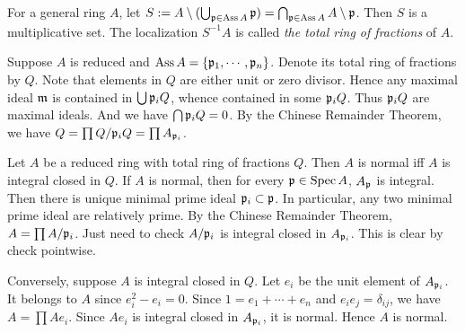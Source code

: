     \begin{remark}\label{rmk: total ring of fractions and normality of general reduced ring}
        For a general ring $A$, let $S := A\setminus (\bigcup_{{\mathfrak{p}} \in \operatorname{Ass} A} {\mathfrak{p}}) = \bigcap_{{\mathfrak{p}} \in \operatorname{Ass} A}A\setminus {\mathfrak{p}}$.
        Then $S$ is a multiplicative set.
        The localization $S^{-1}A$ is called \textit{the total ring of fractions} of $A$.
        
        Suppose $A$ is reduced and $\operatorname{Ass} A = \{{\mathfrak{p}}_1,\cdots,{\mathfrak{p}}_n\}$.
        Denote its total ring of fractions by $Q$.
        Note that elements in $Q$ are either unit or zero divisor.
        Hence any maximal ideal ${\mathfrak{m}}$ is contained in $\bigcup {\mathfrak{p}}_iQ$, whence contained in some ${\mathfrak{p}}_i Q$.
        Thus ${\mathfrak{p}}_i Q$ are maximal ideals.
        And we have $\bigcap {\mathfrak{p}}_i Q = 0$. 
        By the Chinese Remainder Theorem, we have $Q = \prod Q/{{\mathfrak{p}}_i}Q = \prod A_{{\mathfrak{p}}_i}$.
        
        Let $A$ be a reduced ring with total ring of fractions $Q$.
        Then $A$ is normal iff $A$ is integral closed in $Q$.
        If $A$ is normal, then for every ${\mathfrak{p}} \in \operatorname{Spec} A$, $A_{\mathfrak{p}}$ is integral.
        Then there is unique minimal prime ideal ${\mathfrak{p}}_i \subset {\mathfrak{p}}$.
        In particular, any two minimal prime ideal are relatively prime.
        By the Chinese Remainder Theorem, $A = \prod A/{\mathfrak{p}}_i$.
        Just need to check $A/{\mathfrak{p}}_i$ is integral closed in $A_{{\mathfrak{p}}_i}$.
        This is clear by check pointwise.

        Conversely, suppose $A$ is integral closed in $Q$.
        Let $e_i$ be the unit element of $A_{{\mathfrak{p}}_i}$.
        It belongs to $A$ since $e_i^2 - e_i = 0$.
        Since $1 = e_1 + \cdots + e_n$ and $e_ie_j = \delta_{ij}$, we have $A = \prod Ae_i$.
        Since $Ae_i$ is integral closed in $A_{{\mathfrak{p}}_i}$, it is normal.
        Hence $A$ is normal.
    \end{remark}

